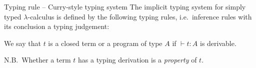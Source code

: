 
\begin{frame}{Typing rule -- Curry-style typing system}
  The implicit typing system for simply typed $\lambda$-calculus is defined by the following typing rules, i.e.\ 
  inference rules with its conclusion a typing judgement:
  
  \begin{prooftree}
  \end{prooftree}
  \begin{prooftree}
  \end{prooftree}
  \begin{prooftree}
  \end{prooftree}
  We say that $t$ is a \alert{closed term} or a \alert{program} of type $A$ if $\vdash t : A$ is derivable. 

  N.B.\ Whether a term $t$ has a typing derivation is a \emph{property} of $t$.
\end{frame}

